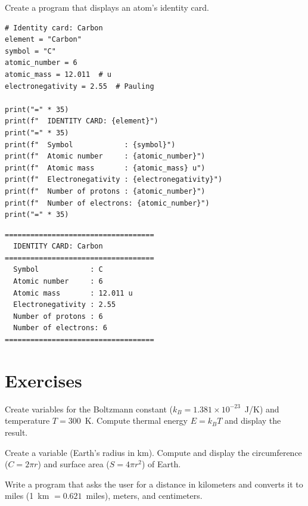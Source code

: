 \begin{projet}
Create a program that displays an atom's identity card.

\begin{codeblock}[title=\textbf{Python}]
\begin{verbatim}
# Identity card: Carbon
element = "Carbon"
symbol = "C"
atomic_number = 6
atomic_mass = 12.011  # u
electronegativity = 2.55  # Pauling

print("=" * 35)
print(f"  IDENTITY CARD: {element}")
print("=" * 35)
print(f"  Symbol            : {symbol}")
print(f"  Atomic number     : {atomic_number}")
print(f"  Atomic mass       : {atomic_mass} u")
print(f"  Electronegativity : {electronegativity}")
print(f"  Number of protons : {atomic_number}")
print(f"  Number of electrons: {atomic_number}")
print("=" * 35)
\end{verbatim}
\end{codeblock}

\begin{codeoutput}
\begin{verbatim}
===================================
  IDENTITY CARD: Carbon
===================================
  Symbol            : C
  Atomic number     : 6
  Atomic mass       : 12.011 u
  Electronegativity : 2.55
  Number of protons : 6
  Number of electrons: 6
===================================
\end{verbatim}
\end{codeoutput}
\end{projet}

\section{Exercises}

\begin{exercise}
Create variables for the Boltzmann constant ($k_B = 1.381 \times 10^{-23}$~J/K) and temperature $T = 300$~K. Compute thermal energy $E = k_B T$ and display the result.
\end{exercise}

\begin{exercise}
Create a variable  (Earth's radius in km). Compute and display the circumference ($C = 2\pi r$) and surface area ($S = 4\pi r^2$) of Earth.
\end{exercise}

\begin{exercise}
Write a program that asks the user for a distance in kilometers and converts it to miles (1~km $= 0.621$~miles), meters, and centimeters.
\end{exercise}

